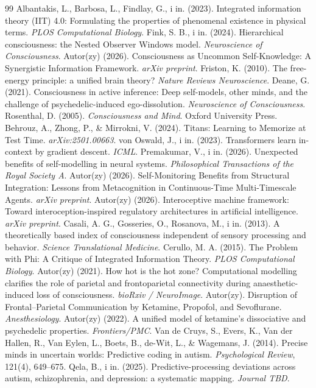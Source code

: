 \documentclass[11pt]{article}
\begin{document}
\begin{thebibliography}{99}
 Albantakis, L., Barbosa, L., Findlay, G., i in. (2023). Integrated information theory (IIT) 4.0: Formulating the properties of phenomenal existence in physical terms. \emph{PLOS Computational Biology}.
 Fink, S. B., i in. (2024). Hierarchical consciousness: the Nested Observer Windows model. \emph{Neuroscience of Consciousness}.
 Autor(zy) (2026). Consciousness as Uncommon Self-Knowledge: A Synergistic Information Framework. \emph{arXiv preprint}.
 Friston, K. (2010). The free-energy principle: a unified brain theory? \emph{Nature Reviews Neuroscience}.
 Deane, G. (2021). Consciousness in active inference: Deep self-models, other minds, and the challenge of psychedelic-induced ego-dissolution. \emph{Neuroscience of Consciousness}.
 Rosenthal, D. (2005). \emph{Consciousness and Mind}. Oxford University Press.
 Behrouz, A., Zhong, P., \& Mirrokni, V. (2024). Titans: Learning to Memorize at Test Time. \emph{arXiv:2501.00663}.
 von Oswald, J., i in. (2023). Transformers learn in-context by gradient descent. \emph{ICML}.
 Premakumar, V., i in. (2026). Unexpected benefits of self-modelling in neural systems. \emph{Philosophical Transactions of the Royal Society A}.
 Autor(zy) (2026). Self-Monitoring Benefits from Structural Integration: Lessons from Metacognition in Continuous-Time Multi-Timescale Agents. \emph{arXiv preprint}.
 Autor(zy) (2026). Interoceptive machine framework: Toward interoception-inspired regulatory architectures in artificial intelligence. \emph{arXiv preprint}.
 Casali, A. G., Gosseries, O., Rosanova, M., i in. (2013). A theoretically based index of consciousness independent of sensory processing and behavior. \emph{Science Translational Medicine}.
 Cerullo, M. A. (2015). The Problem with Phi: A Critique of Integrated Information Theory. \emph{PLOS Computational Biology}.
 Autor(zy) (2021). How hot is the hot zone? Computational modelling clarifies the role of parietal and frontoparietal connectivity during anaesthetic-induced loss of consciousness. \emph{bioRxiv / NeuroImage}.
 Autor(zy). Disruption of Frontal--Parietal Communication by Ketamine, Propofol, and Sevoflurane. \emph{Anesthesiology}.
 Autor(zy) (2022). A unified model of ketamine's dissociative and psychedelic properties. \emph{Frontiers/PMC}.
 Van de Cruys, S., Evers, K., Van der Hallen, R., Van Eylen, L., Boets, B., de-Wit, L., \& Wagemans, J. (2014). Precise minds in uncertain worlds: Predictive coding in autism. \emph{Psychological Review}, 121(4), 649--675.
 Qela, B., i in. (2025). Predictive-processing deviations across autism, schizophrenia, and depression: a systematic mapping. \emph{Journal TBD}.
\end{thebibliography}
\end{document}
